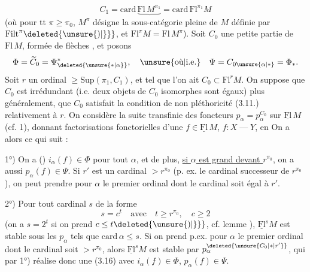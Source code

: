 \[
C_1=\mathrm{card}\,\underbrace{\mathrm{Fl}\,M^{\pi_1}}=\mathrm{card}\,\mathrm{Fl}^{\pi_1}M
\]
(où pour tt $\pi\ge\pi_0$, $M^\pi$ désigne la sous-catégorie  pleine de $M$ définie par $\mathrm{Filt}^\pi\deleted{\unsure{)|\}}}$, et $\mathrm{Fl}^\pi M=\mathrm{Fl}\,M^\pi$).
Soit $C_0$ une petite partie de $\mathrm{Fl}\,M$, formée de flèches , et posons
\[
\Phi=\widetilde{C}_0=\Psi_{\deleted{\unsure{*|\alpha}}}^{*},\quad\text{\unsure{où|i.e.}}\quad\Psi=C_{0\unsure{\alpha|*}}=\Phi_*.
\]
Soit $r$ un ordinal $\ge\mathrm{Sup}(\pi_1,C_1)$, et tel que l'on ait $C_0\subset\mathrm{Fl}^rM$. On suppose que $C_0$ est irrédundant (i.e. deux objets de $C_0$ isomorphes sont égaux) plus généralement, que $C_0$ satisfait la  condition de non pléthoricité (3.11.) relativement à $r$.
On considère la suite transfinie des foncteurs $p_\alpha=p_\alpha^{C_0}$ sur $\underline{\mathrm{Fl}}\,M$ (cf. 1),    donnant   factorisations fonctorielles d'une $f\in\underline{\mathrm{Fl}}\,M$, $f:X\mathrel{\text{---}}Y$, en
On a alors ce qui suit :

1°) On a () $i_\alpha(f)\in\Phi$ pour tout $\alpha$, et de plus, \uline{si $\alpha$ est grand devant $r^{\pi_0}$}, on a aussi $p_\alpha(f)\in\Psi$. Si $r'$ est un cardinal $>r^{\pi_0}$ (p. ex. le  cardinal successeur de $r^{\pi_0}$), on peut prendre pour $\alpha$ le premier ordinal dont le cardinal soit égal à $r'$.

2°)  Pour tout cardinal $s$ de la forme
\[
s=c^t\quad\text{avec}\quad t\ge r^{\pi_0},\quad c\ge2
\]
(on a $s=2^t$ si on prend $c\le t\deleted{\unsure{)|\}}}$, cf. lemme ), $\underline{\mathrm{Fl}}^sM$ est stable sous les $p_\alpha$ tels que $\mathrm{card}\,\alpha\le s$. Si on prend p.ex. pour $\alpha$ le premier ordinal dont le cardinal soit $>r^{\pi_0}$, alors $\underline{\mathrm{Fl}}^sM$ est stable par $p_\alpha^{\deleted{\unsure{C_0|*|r'}}}$, qui par 1°) réalise donc une  (3.16) avec $i_\alpha(f)\in\Phi$, $p_\alpha(f)\in\Psi$.

